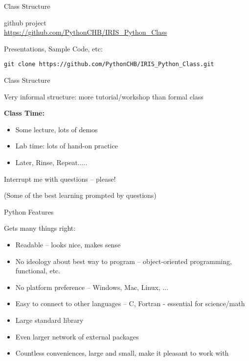 \documentclass{beamer}
\begin{document}
\begin{frame}[fragile]{Class Structure}

{\LARGE github project} \\
\url{https://github.com/PythonCHB/IRIS_Python_Class}

\vfill
{\large Presentations, Sample Code, etc:}

{\small
\begin{verbatim}
git clone https://github.com/PythonCHB/IRIS_Python_Class.git
\end{verbatim}
}
\end{frame}

\begin{frame}{Class Structure}

{\Large Very informal structure: more tutorial/workshop than formal class}

\vfill
{\large \bf Class Time:}
  \begin{itemize}
     \item Some lecture, lots of demos
     \item Lab time: lots of hand-on practice
     \item Later, Rinse, Repeat.....
  \end{itemize}

\vfill
Interrupt me with questions -- please!

\vfill
(Some of the best learning prompted by questions)


\end{frame}

\begin{frame}{Python Features}
 
{\Large Gets many things right:}
\begin{itemize}
  \item  Readable -- looks nice, makes sense
  \item  No ideology about best way to program -- 
   object-oriented programming,  functional, etc.
  \item  No platform preference -- Windows, Mac, Linux, ...
  \item  Easy to connect to other languages -- C, Fortran - essential for science/math
  \item  Large standard library 
  \item  Even larger network of external packages
  \item  Countless conveniences, large and small, make it pleasant to work with
\end{itemize}
\end{frame}
\end{document}
